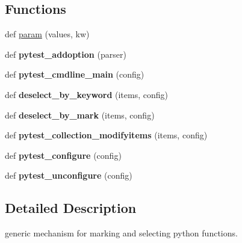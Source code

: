 \subsection*{Functions}
\begin{DoxyCompactItemize}
\item 
def \hyperlink{namespace__pytest_1_1mark_accf86ce8219b1b4a565453330568b6b8}{param} (values, kw)
\item 
\mbox{\label{namespace__pytest_1_1mark_a6c0576c6c4a5ef9c79556acad24cf8c2}} 
def {\bfseries pytest\+\_\+addoption} (parser)
\item 
\mbox{\label{namespace__pytest_1_1mark_a67aebef1a2449fe7ee4b89744a1e46c5}} 
def {\bfseries pytest\+\_\+cmdline\+\_\+main} (config)
\item 
\mbox{\label{namespace__pytest_1_1mark_afa13a08c6a6d1c497685dce4136a302e}} 
def {\bfseries deselect\+\_\+by\+\_\+keyword} (items, config)
\item 
\mbox{\label{namespace__pytest_1_1mark_ad0c13bc86c3a5465b27f44b9100d4742}} 
def {\bfseries deselect\+\_\+by\+\_\+mark} (items, config)
\item 
\mbox{\label{namespace__pytest_1_1mark_adde1733e109dc92c38315f2fb23f0fb1}} 
def {\bfseries pytest\+\_\+collection\+\_\+modifyitems} (items, config)
\item 
\mbox{\label{namespace__pytest_1_1mark_aba57d084b88f3c63b94eeb1c6c1a957c}} 
def {\bfseries pytest\+\_\+configure} (config)
\item 
\mbox{\label{namespace__pytest_1_1mark_a633f9b78c7be7f6f9d36ac5043361805}} 
def {\bfseries pytest\+\_\+unconfigure} (config)
\end{DoxyCompactItemize}


\subsection{Detailed Description}
\begin{DoxyVerb}generic mechanism for marking and selecting python functions. \end{DoxyVerb}
 

